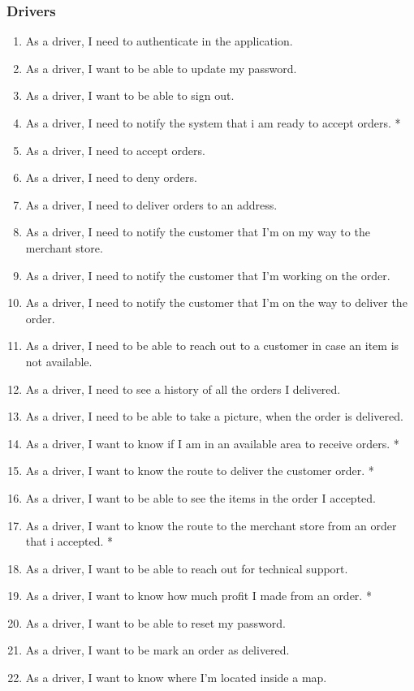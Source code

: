 \subsubsection{Drivers}
\begin{enumerate}[resume, label=USR-\arabic*]
    \item As a driver, I need to authenticate in the application.
    \item As a driver, I want to be able to update my password.
    \item As a driver, I want to be able to sign out.
    \item As a driver, I need to notify the system that i am ready to 
    accept orders. *
    \item As a driver, I need to accept orders.
    \item As a driver, I need to deny orders.
    \item As a driver, I need to deliver orders to an address.
    \item As a driver, I need to notify the customer that I’m on my way to the 
    merchant store.
    \item As a driver, I need to notify the customer that I’m working on the 
    order.
    \item As a driver, I need to notify the customer that I’m on the way to 
    deliver the order.
    \item As a driver, I need to be able to reach out to a customer in case an 
    item is not available.
    \item As a driver, I need to see a history of all the orders I delivered.
    \item As a driver, I need to be able to take a picture, when the order is 
    delivered.
    \item As a driver, I want to know if I am in an available area to receive 
    orders. *
    \item As a driver, I want to know the route to deliver the customer order. *
    \item As a driver, I want to be able to see the items in the order I 
    accepted.
    \item As a driver, I want to know the route to the merchant store from an 
    order that i accepted. *
    \item As a driver, I want to be able to reach out for technical support.
    \item As a driver, I want to know how much profit I made from an order. *
    \item As a driver, I want to be able to reset my password.
    \item As a driver, I want to be mark an order as delivered.
    \item As a driver, I want to know where I'm located inside a map.
\end{enumerate}
\pagebreak
